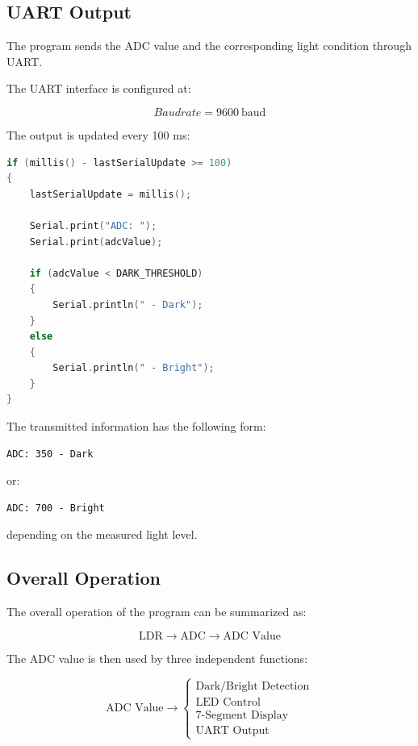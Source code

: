 \documentclass[12pt,a4paper]{article}
\begin{document}
\subsection{UART Output}

The program sends the ADC value and the corresponding light condition
through UART.

The UART interface is configured at:

\[
Baudrate = 9600\ \mathrm{baud}
\]

The output is updated every 100 ms:

\begin{lstlisting}[language=C]
if (millis() - lastSerialUpdate >= 100)
{
    lastSerialUpdate = millis();

    Serial.print("ADC: ");
    Serial.print(adcValue);

    if (adcValue < DARK_THRESHOLD)
    {
        Serial.println(" - Dark");
    }
    else
    {
        Serial.println(" - Bright");
    }
}
\end{lstlisting}

The transmitted information has the following form:

\begin{lstlisting}
ADC: 350 - Dark
\end{lstlisting}

or:

\begin{lstlisting}
ADC: 700 - Bright
\end{lstlisting}

depending on the measured light level.

\subsection{Overall Operation}

The overall operation of the program can be summarized as:

\[
\text{LDR}
\rightarrow
\text{ADC}
\rightarrow
\text{ADC Value}
\]

The ADC value is then used by three independent functions:

\[
\text{ADC Value}
\rightarrow
\begin{cases}
\text{Dark/Bright Detection}\\
\text{LED Control}\\
\text{7-Segment Display}\\
\text{UART Output}
\end{cases}
\]
\end{document}
